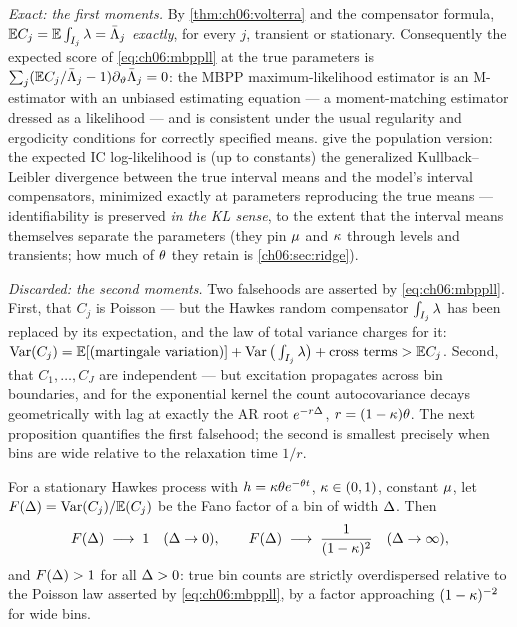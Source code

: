 \emph{Exact: the first moments.} By \cref{thm:ch06:volterra} and the
compensator formula, $\mathbb{E} C_j = \mathbb{E}\int_{I_j}\lambda = \bar{\Lambda}_j$
\emph{exactly}, for every $j$, transient or stationary. Consequently the
expected score of \cref{eq:ch06:mbppll} at the true parameters is
$\sum_j (\mathbb{E} C_j/\bar{\Lambda}_j - 1)\partial_{\vartheta}\bar{\Lambda}_j = 0$: the
MBPP maximum-likelihood estimator is an M-estimator with an unbiased
estimating equation --- a moment-matching estimator dressed as a
likelihood --- and is consistent under the usual regularity and ergodicity
conditions for correctly specified means. \citet[Prop.~8]{rizoiu2022} give
the population version: the expected IC log-likelihood is (up to constants)
the generalized Kullback--Leibler divergence between the true interval
means and the model's interval compensators, minimized exactly at
parameters reproducing the true means --- identifiability is preserved
\emph{in the KL sense}, to the extent that the interval means themselves
separate the parameters (they pin $\mu$ and $\kappa$ through levels and
transients; how much of $\theta$ they retain is
\cref{ch06:sec:ridge}).

\emph{Discarded: the second moments.} Two falsehoods are asserted by
\cref{eq:ch06:mbppll}. First, that $C_j$ is Poisson --- but the Hawkes
random compensator $\int_{I_j}\lambda$ has been replaced by its expectation,
and the law of total variance charges for it:
$\operatorname{Var}(C_j) = \mathbb{E}[\text{(martingale variation)}] + \operatorname{Var}\big(\textstyle
\int_{I_j}\lambda\big) + \text{cross terms} > \mathbb{E} C_j$. Second, that
$C_1,\dots,C_J$ are independent --- but excitation propagates across bin
boundaries, and for the exponential kernel the count autocovariance decays
geometrically with lag at exactly the AR root $e^{-r\Delta}$,
$r = (1-\kappa)\theta$. The next proposition quantifies the first
falsehood; the second is smallest precisely when bins are wide relative to
the relaxation time $1/r$.

\begin{proposition}\label{prop:ch06:overdisp}
For a stationary Hawkes process with $h = \kappa\theta
e^{-\theta t}$, $\kappa\in(0,1)$, constant $\mu$, let
$F(\Delta) = \operatorname{Var}(C_j)/\mathbb{E}(C_j)$ be the Fano factor of a bin of width
$\Delta$. Then
\begin{equation}\label{eq:ch06:fano}
F(\Delta) \;\longrightarrow\; 1 \quad (\Delta \to 0),
\qquad
F(\Delta) \;\longrightarrow\; \frac{1}{(1-\kappa)^2}
\quad (\Delta \to \infty),
\end{equation}
and $F(\Delta) > 1$ for all $\Delta > 0$: true bin counts are strictly
overdispersed relative to the Poisson law asserted by
\cref{eq:ch06:mbppll}, by a factor approaching $(1-\kappa)^{-2}$ for wide
bins.
\end{proposition}

